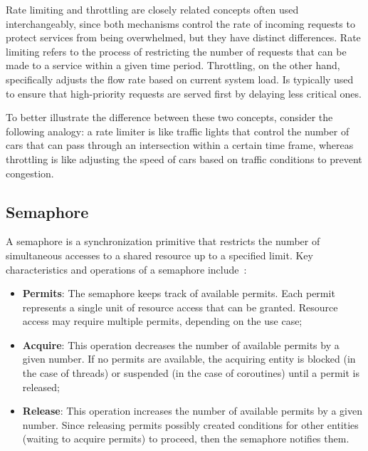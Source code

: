Rate limiting and throttling are closely related concepts often used interchangeably,
since both mechanisms control the rate of incoming requests to protect services from being overwhelmed, but they have distinct differences.
Rate limiting refers to the process of restricting the number of requests that can be made to a service within a given time period.
Throttling, on the other hand,
specifically adjusts the flow rate based on current system load.
Is typically used to ensure that high-priority requests are served first by delaying less critical ones.

To better illustrate the difference between these two concepts, consider the following analogy:
a rate limiter is like traffic lights that control the number of cars that can pass through an intersection within a certain time frame,
whereas throttling is like adjusting the speed of cars based on traffic conditions to prevent congestion.

\subsection{Semaphore}\label{subsec:rate-limiter-semaphore}

A semaphore is a synchronization primitive that restricts the number of simultaneous accesses to a shared resource
up to a specified limit.
Key characteristics and operations of a semaphore include~\cite{java-semaphore, oracle-multithreaded-programming-guide}:

\begin{itemize}
    \item \textbf{Permits}: The semaphore keeps track of available permits.
    Each permit represents a single unit of resource access that can be granted.
    Resource access may require multiple permits, depending on the use case;
    \item \textbf{Acquire}: This operation decreases the number of available permits by a given number.
    If no permits are available, the acquiring entity is blocked (in the case of threads) or suspended (in the case of coroutines) until a permit is released;
    \item \textbf{Release}: This operation increases the number of available permits by a given number.
    Since releasing permits possibly created conditions for other entities (waiting to acquire permits) to proceed, then the semaphore notifies them.
\end{itemize}

